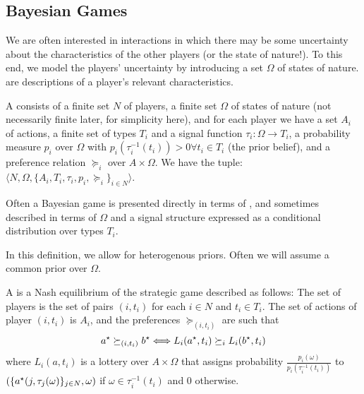 \documentclass[10pt]{article}
\begin{document}
\subsection{Bayesian Games}

We are often interested in interactions in which there may be some uncertainty about the characteristics of the other players (or the state of nature!). To this end, we model the players' uncertainty by introducing a set $\Omega$ of states of nature.  are descriptions of a player's relevant characteristics.

\begin{definition}
	A  consists of a finite set $N$ of players, a finite set $\Omega$ of states of nature (not necessarily finite later, for simplicity here), and for each player we have a set $A_i$ of actions, a finite set of types $T_i$ and a signal function $\tau_i:\Omega \to T_i$, a probability measure $p_i$ over $\Omega$ with $p_i(\tau_i^{-1}(t_i)) > 0 \forall t_i \in T_i$ (the prior belief), and a preference relation $\succeq_i$ over $A \times \Omega$. We have the tuple: $\langle N, \Omega, \{A_i,T_i,\tau_i,p_i,\succeq_i\}_{i\in N}\rangle$.
\end{definition}

Often a Bayesian game is presented directly in terms of , and sometimes described in terms of $\Omega$ and a signal structure expressed as a conditional distribution over types $T_i$. 
\begin{remark}
	In this definition, we allow for heterogenous priors. Often we will assume a common prior over $\Omega$.
\end{remark}

\begin{definition}
	A  is a Nash equilibrium of the strategic game described as follows: The set of players is the set of pairs $(i,t_i)$ for each $i \in N$ and $t_i \in T_i$. The set of actions of player $(i,t_i)$ is $A_i$, and the preferences $\succeq_{(i,t_i)}$ are such that \[a^\star \succeq_{(i,t_i)} b^\star \Longleftrightarrow L_i(a^\star,t_i) \succeq_i L_i(b^\star,t_i)\]where $L_i(a,t_i)$ is a lottery over $A \times \Omega$ that assigns probability $\frac{p_i(\omega)}{p_i(\tau_i^{-1}(t_i))}$ to $(\{a^\star(j,\tau_j(\omega)\}_{j \in N},\omega)$ if $\omega \in \tau_i^{-1}(t_i)$ and 0 otherwise.
\end{definition}
\end{document}
